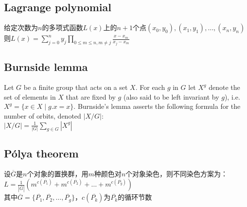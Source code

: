     \subsection*{Lagrange polynomial}
        给定次数为$ n $的多项式函数$ L(x) $上的$ n + 1 $个点$ (x_0, y_0), (x_1, y_1), \dots, (x_n, y_n) $
        \\则$ L(x) = \sum\limits_{j = 0}^{n} y_j \prod\limits_{0 \leq m \leq n, m \ne j} \frac{x - x_m}{x_j - x_m} $
    \subsection*{Burnside lemma}
        Let $ G $ be a finite group that acts on a set $ X $. For each $ g $ in $ G $ let $ X^g $ denote the set of elements in $ X $ that are fixed by $ g $ (also said to be left invariant by $ g $), i.e. $ X^g = \lbrace x \in X \mid g.x = x \rbrace $. Burnside's lemma asserts the following formula for the number of orbits, denoted $ \left| X / G \right| $:
        \\$ \left| X / G \right| = \frac{1}{\left| G \right|} \sum\limits_{g \in G}^{} \left| X^g \right| $
    \subsection*{Pólya theorem}
        设$ \overline{G} $是$ n $个对象的置换群，用$ m $种颜色对$ n $个对象染色，则不同染色方案为：
        \\$ L = \frac{1}{\left| \overline{G} \right|} (m^{c(\overline{P_1})} + m^{c(\overline{P_2})} + \dots + m^{c(\overline{P_g})}) $
        \\其中$ \overline{G} = \lbrace \overline{P_1}, \overline{P_2}, \dots, \overline{P_g} \rbrace $，$ c(\overline{P_k}) $为$ \overline{P_k} $的循环节数
